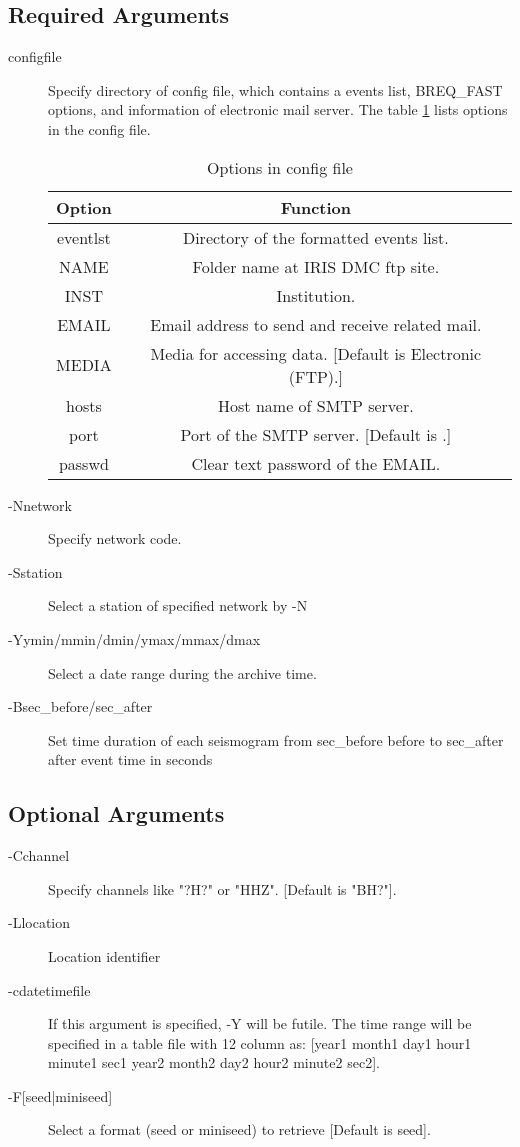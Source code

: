 \documentclass[12pt, a4paper]{report}
\begin{document}
\subsection{Required Arguments}
\begin{description}
\item[{\ti configfile}] Specify directory of config file, which contains a events list, BREQ\_FAST options, and information of electronic mail server. The table \ref{tab31} lists options in the config file.
\begin{table}
\caption{Options in config file}
\centering
\begin{tabular}{c|c}\toprule[1.5 pt]
Option & Function \\ \midrule[1 pt]
{\C eventlst} & Directory of the formatted events list.\\
{\C NAME} &  Folder name at IRIS DMC ftp site.\\
{\C INST} & Institution.\\
{\C EMAIL} & Email address to send and receive related mail.\\
{\C MEDIA} & Media for accessing data. [Default is {\C Electronic (FTP)}.]\\
{\C hosts} & Host name of SMTP server.\\
{\C port} & Port of the SMTP server. [Default is {\C 25}.]\\
{\C passwd} & Clear text password of the {\C EMAIL}.\\
\bottomrule[1.5 pt]
\end{tabular}
\label{tab31}
\end{table}
\item[{\tb -N}{\ti network}] Specify network code.
\item[{\tb -S}{\ti station}] Select a station of specified network by {\tb -N}
\item[{\tb -Y}{\ti ymin/mmin/dmin/ymax/mmax/dmax}] Select a date range during the archive time.
\item[{\tb -B}{\ti sec\_before/sec\_after}] Set time duration of each seismogram from {\ti sec\_before} before to {\ti sec\_after} after event time in seconds
\end{description}
\subsection{Optional Arguments}
\begin{description}
\item[{\tb -C}{\ti channel}] Specify channels like "{\ti ?H?}" or "{\ti HHZ}". [Default is "{\ti BH?}"]. 
\item[{\tb -L}{\ti location}] Location identifier
\item[{\tb -c}{\ti datetimefile}] If this argument is specified, {\tb -Y} will be futile. The time range will be specified in a table file with 12 column as: [{\ti year1 month1 day1 hour1 minute1 sec1 year2 month2 day2 hour2 minute2 sec2}].
\item[{\tb -F[{\ti seed}|{\ti miniseed}]}] Select a format (seed or miniseed) to retrieve [Default is {\ti seed}].
\end{description}
\end{document}
